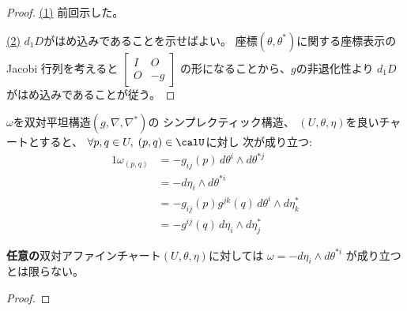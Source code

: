 \documentclass[report]{jlreq}
\begin{document}
\begin{proof}
    \uline{(1)} \quad
    前回示した。

    \uline{(2)} \quad
    $d_1 D$がはめ込みであることを示せばよい。
    座標$(\theta, \theta^*)$に関する座標表示の
    Jacobi 行列を考えると
    $\begin{bmatrix}
        I & O \\
        O & -g
    \end{bmatrix}$
    の形になることから、$g$の非退化性より
    $d_1 D$がはめ込みであることが従う。
\end{proof}

\begin{proposition}
    $\omega$を双対平坦構造$(g, \nabla, \nabla^*)$の
    シンプレクティック構造、
    $(U, \theta, \eta)$を良いチャートとすると、
    $\forall p, q \in U, \; (p, q) \in \calU$に対し
    次が成り立つ:
    \begin{alignat}{1}
        \omega_{(p, q)}
            &=
                - g_{ij}(p) \,
                d\theta^i \wedge d\theta^{*j}
                \\
            &=
                - d\eta_i \wedge d\theta^{*i}
                \\
            &=
                - g_{ij}(p) g^{jk}(q) \,
                d\theta^i \wedge d\eta^*_k
                \\
            &=
                - g^{ij}(q) \,
                d\eta_i \wedge d\eta^*_j
    \end{alignat}
\end{proposition}

\begin{remark}
    \textbf{任意の}双対アファインチャート$(U, \theta, \eta)$に対しては
    $\omega = - d\eta_i \wedge d\theta^{*i}$
    が成り立つとは限らない。
\end{remark}

\begin{proof}
    \TODO{}
\end{proof}
\end{document}

